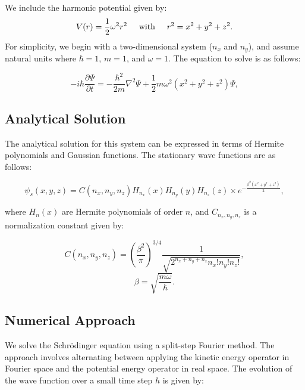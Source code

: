 We include the harmonic potential given by:
\begin{equation}
    V(r) = \frac{1}{2}  \omega^2 r^2 \hspace{0.5cm} \text{with} \hspace{0.5cm} r^2 = x^2 + y^2 + z^2.
\end{equation} 
For simplicity, we begin with a two-dimensional system ($n_x$ and $n_y$), and assume natural units where $\hbar = 1$, $m = 1$, and $\omega = 1$. The equation to solve is as follows:

\begin{equation}
-i \hbar \frac{\partial \Psi}{\partial t} = -\frac{\hbar^2}{2m} \nabla^2 \Psi + \frac{1}{2}m \omega^2 (x^2 + y^2 + z^2)\Psi,
\end{equation}


\subsection*{Analytical Solution}

The analytical solution for this system can be expressed in terms of Hermite polynomials and Gaussian functions. The stationary wave functions are as follows:

\begin{equation}
\psi_s(x, y, z) = C(n_x, n_y, n_z) H_{n_x}(x) H_{n_y}(y) H_{n_z}(z) 
\times e^{-\frac{\beta^2 (x^2 + y^2 + z^2)}{2}},
\end{equation}


where $H_{n}(x)$ are Hermite polynomials of order $n$, and $C_{n_x, n_y,n_z}$ is a normalization constant given by:

\begin{equation}
C(n_x, n_y, n_z) = \left(\frac{\beta^2}{\pi}\right)^{3/4} \frac{1}{\sqrt{2^{n_x + n_y + n_z} n_x! n_y! n_z!}},
\end{equation}
\begin{equation}
\beta = \sqrt{\frac{m \omega}{\hbar}}.
\end{equation}




\subsection*{Numerical Approach}

We solve the Schrödinger equation using a split-step Fourier method. The approach involves alternating between applying the kinetic energy operator in Fourier space and the potential energy operator in real space. The evolution of the wave function over a small time step $h$ is given by:

